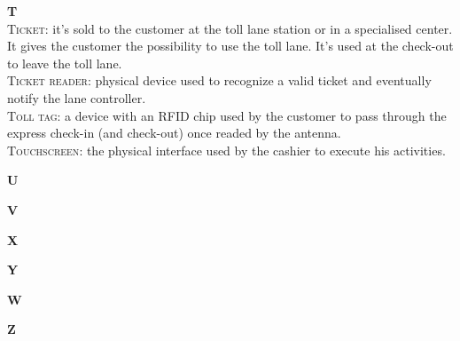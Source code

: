 \begin{list}{}
\item \textbf{T}\\
\textsc{Ticket}: it's sold to the customer at the toll lane station or in a specialised center. It gives the customer the possibility to use the toll lane. It's used at the check-out to leave the toll lane.\\
\textsc{Ticket reader}: physical device used to recognize a valid ticket and eventually notify the lane controller.\\
\textsc{Toll tag}: a device with an RFID chip used by the customer to pass through the express check-in (and check-out) once readed by the antenna.\\
\textsc{Touchscreen}: the physical interface used by the cashier to execute his activities.\\
\item \textbf{U}
\item \textbf{V}
\item \textbf{X}
\item \textbf{Y}
\item \textbf{W}
\item \textbf{Z}
\end{list}
